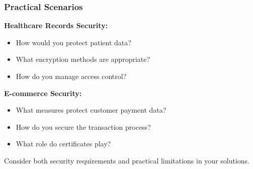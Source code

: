 \documentclass{beamer}
\begin{document}
\begin{frame}
    \frametitle{Practical Scenarios}
    
    \textbf{Healthcare Records Security:}
    \begin{itemize}
        \item How would you protect patient data?
        \item What encryption methods are appropriate?
        \item How do you manage access control?
    \end{itemize}
    
    \textbf{E-commerce Security:}
    \begin{itemize}
        \item What measures protect customer payment data?
        \item How do you secure the transaction process?
        \item What role do certificates play?
    \end{itemize}
    
    Consider both security requirements and practical limitations in your solutions.
\end{frame}
\end{document}

